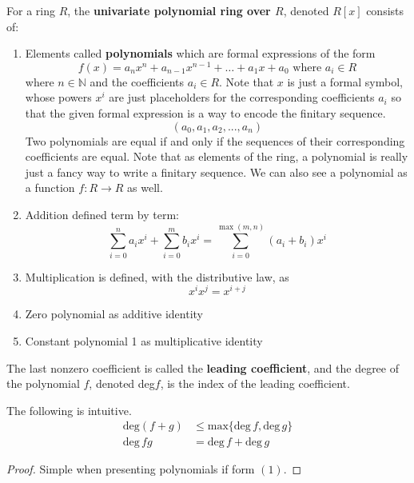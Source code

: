   \begin{definition}
    For a ring $R$, the \textbf{univariate polynomial ring over $R$}, denoted $R[x]$ consists of:
    \begin{enumerate}
      \item Elements called \textbf{polynomials} which are formal expressions of the form 
      \begin{equation}
        f(x) = a_nx^n + a_{n-1}x^{n-1} + \dots + a_1x + a_0 \text{ where } a_i \in R
      \end{equation}
      where $n \in \mathbb{N}$ and the coefficients $a_i \in R$. Note that $x$ is just a formal symbol, whose powers $x^i$ are just placeholders for the corresponding coefficients $a_i$ so that the given formal expression is a way to encode the finitary sequence. 
      \begin{equation}
        (a_0, a_1, a_2, ..., a_n)
      \end{equation}
      Two polynomials are equal if and only if the sequences of their corresponding coefficients are equal. Note that as elements of the ring, a polynomial is really just a fancy way to write a finitary sequence. We can also see a polynomial as a function $f: R \rightarrow R$ as well. 

      \item Addition defined term by term:
      \begin{equation}
        \sum_{i=0}^n a_ix^i + \sum_{i=0}^m b_ix^i = \sum_{i=0}^{\max(m,n)} (a_i + b_i)x^i
      \end{equation}

      \item Multiplication is defined, with the distributive law, as 
      \begin{equation}
        x^ix^j = x^{i+j}
      \end{equation}
      \item Zero polynomial as additive identity
      \item Constant polynomial 1 as multiplicative identity
    \end{enumerate}
    The last nonzero coefficient is called the \textbf{leading coefficient}, and the degree of the polynomial $f$, denoted deg$f$, is the index of the leading coefficient.
  \end{definition} 

  \begin{theorem}
    The following is intuitive. 
    \begin{align}
      \text{deg}(f+g) & \leq \text{max}\{\text{deg}\,f, \text{deg} \,g\} \\
      \text{deg} \,f g & = \text{deg} \,f + \text{deg} \,g
    \end{align}
  \end{theorem}
  \begin{proof}
    Simple when presenting polynomials if form $(1)$. 
  \end{proof}

